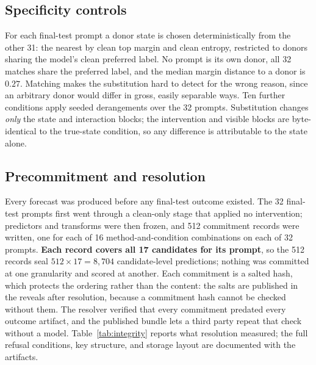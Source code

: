 \documentclass{article}
\begin{document}
\subsection{Specificity controls}

For each final-test prompt a donor state is chosen deterministically from the other 31: the nearest
by clean top margin and clean entropy, restricted to donors sharing the model's clean preferred
label. No prompt is its own donor, all 32 matches share the preferred label, and the median margin
distance to a donor is $0.27$. Matching makes the substitution hard to detect for the wrong reason,
since an arbitrary donor would differ in gross, easily separable ways. Ten further conditions apply
seeded derangements over the 32 prompts. Substitution changes \emph{only} the state and interaction
blocks; the intervention and visible blocks are byte-identical to the true-state condition, so any
difference is attributable to the state alone.

\subsection{Precommitment and resolution}

Every forecast was produced before any final-test outcome existed. The 32 final-test prompts first
went through a clean-only stage that applied no intervention; predictors and transforms were then
frozen, and 512 commitment records were written, one for each of 16 method-and-condition
combinations on each of 32 prompts. \textbf{Each record covers all 17 candidates for its prompt},
so the 512 records seal $512 \times 17 = 8{,}704$ candidate-level predictions; nothing was committed
at one granularity and scored at another. Each commitment is a salted hash, which protects the
ordering rather than the content: the salts are published in the reveals after resolution, because
a commitment hash cannot be checked without them. The resolver verified that every commitment
predated every outcome artifact, and the published bundle lets a third party repeat that check
without a model. Table~\ref{tab:integrity} reports what resolution measured; the full refusal
conditions, key structure, and storage layout are documented with the artifacts.
\end{document}
